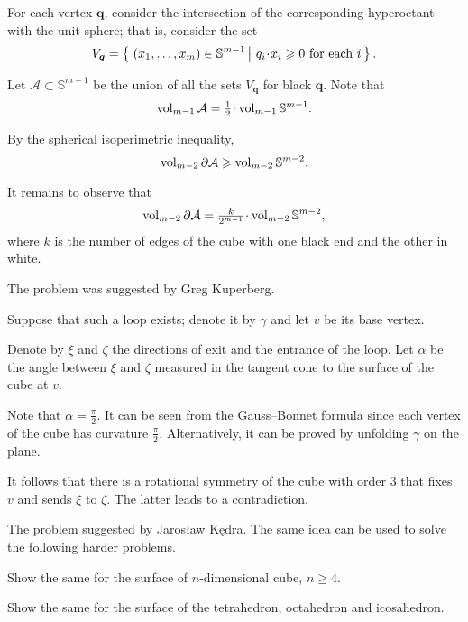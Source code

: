 For each vertex $\bm{q}$,
consider the intersection of the corresponding hyperoctant with the unit sphere;
that is, consider the set
\[V_{\bm{q}}=\set{(x_1,\dots,x_m)\in\mathbb{S}^{m-1}}{q_i\cdot x_i\ge 0\ \text{for each}\ i}.\]

Let $\mathcal{A}\subset\mathbb{S}^{m-1}$ be the union of all the sets $V_{\bm{q}}$ for black $\bm{q}$.
Note that 
\[\vol_{m-1}\mathcal{A}=\tfrac12\cdot\vol_{m-1}\mathbb{S}^{m-1}.\]

By the spherical isoperimetric inequality,
\[\operatorname{\rm vol}\nolimits_{m-2}\partial\mathcal{A}
\geqslant \operatorname{\rm vol}\nolimits_{m-2}\mathbb{S}^{m-2}.\] 

It remains to observe that
\[\vol_{m-2}\partial\mathcal{A}
=
\tfrac k{2^{m-1}}\cdot\vol_{m-2}\mathbb{S}^{m-2},\]
where $k$ is the number of edges of the cube with one black end and the other in white.
\qeds

The problem was suggested by Greg Kuperberg.

Suppose that such a loop exists; denote it by $\gamma$ and let $v$ be its base vertex.

Denote by $\xi$ and $\zeta$ the directions of exit and the entrance of the loop.
Let $\alpha$ be the angle between $\xi$ and $\zeta$
measured in the tangent cone to the surface of the cube at $v$.

Note that $\alpha=\tfrac\pi2$.
It can be seen from the Gauss--Bonnet formula since each vertex of the cube has curvature $\tfrac\pi2$.
Alternatively, it can be proved by unfolding $\gamma$ on the plane.

It follows that there is a rotational symmetry of the cube with order 3 that fixes $v$ and sends $\xi$ to $\zeta$.
The latter leads to a contradiction.
\qeds

The problem suggested by Jaros{\l}aw K\k{e}dra.
The same idea can be used to solve the following harder problems.

\begin{pr}
Show the same for the surface of $n$-dimensional cube, $n\ge 4$.
\end{pr}

\begin{pr}
 Show the same for the surface of the tetrahedron, octahedron and icosahedron.
\end{pr}



